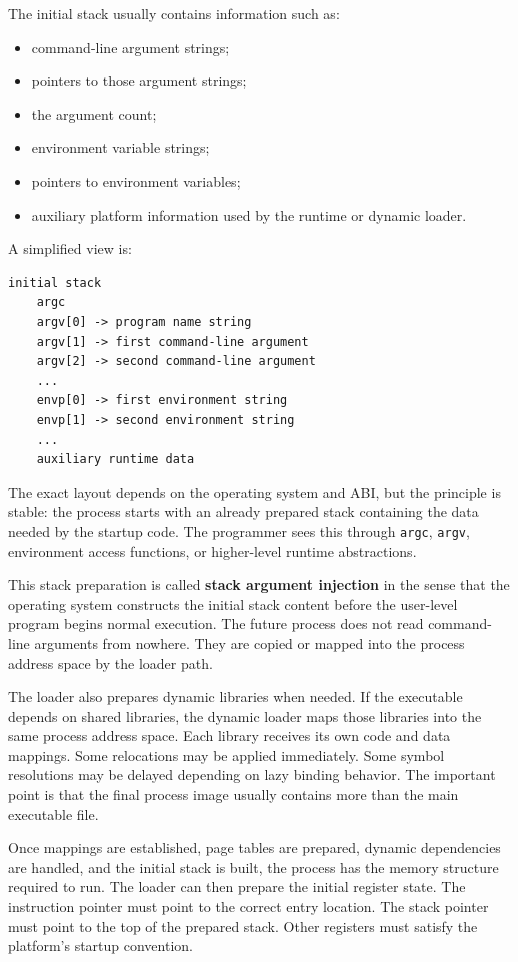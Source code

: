 The initial stack usually contains information such as:

\begin{itemize}
    \item command-line argument strings;
    \item pointers to those argument strings;
    \item the argument count;
    \item environment variable strings;
    \item pointers to environment variables;
    \item auxiliary platform information used by the runtime or dynamic loader.
\end{itemize}

A simplified view is:

\begin{verbatim}
initial stack
    argc
    argv[0] -> program name string
    argv[1] -> first command-line argument
    argv[2] -> second command-line argument
    ...
    envp[0] -> first environment string
    envp[1] -> second environment string
    ...
    auxiliary runtime data
\end{verbatim}

The exact layout depends on the operating system and ABI, but the principle is stable: the process starts with an already prepared stack containing the data needed by the startup code. The programmer sees this through \texttt{argc}, \texttt{argv}, environment access functions, or higher-level runtime abstractions.

This stack preparation is called \textbf{stack argument injection} in the sense that the operating system constructs the initial stack content before the user-level program begins normal execution. The future process does not read command-line arguments from nowhere. They are copied or mapped into the process address space by the loader path.

The loader also prepares dynamic libraries when needed. If the executable depends on shared libraries, the dynamic loader maps those libraries into the same process address space. Each library receives its own code and data mappings. Some relocations may be applied immediately. Some symbol resolutions may be delayed depending on lazy binding behavior. The important point is that the final process image usually contains more than the main executable file.

Once mappings are established, page tables are prepared, dynamic dependencies are handled, and the initial stack is built, the process has the memory structure required to run. The loader can then prepare the initial register state. The instruction pointer must point to the correct entry location. The stack pointer must point to the top of the prepared stack. Other registers must satisfy the platform's startup convention.

